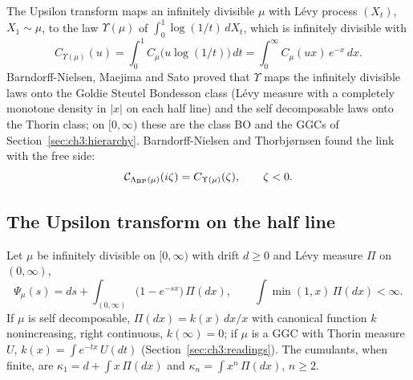 The Upsilon transform \cite{BNT04,BNMS06} maps an infinitely divisible $\mu$ with L\'evy process $(X_t)$, $X_1\sim\mu$, to the law $\Upsilon(\mu)$ of $\int_0^1\log(1/t)\,dX_t$, which is infinitely divisible with
\begin{equation}\label{eq:wigfree:ups}
C_{\Upsilon(\mu)}(u)=\int_0^1C_\mu\big(u\log(1/t)\big)\,dt=\int_0^\infty C_\mu(ux)\,e^{-x}\,dx .
\end{equation}
Barndorff-Nielsen, Maejima and Sato \cite{BNMS06} proved that $\Upsilon$ maps the infinitely divisible laws onto the Goldie Steutel Bondesson class (L\'evy measure with a completely monotone density in $|x|$ on each half line) and the self decomposable laws onto the Thorin class; on $[0,\infty)$ these are the class BO and the GGCs of Section~\ref{sec:ch3:hierarchy}. Barndorff-Nielsen and Thorbj{\o}rnsen \cite{BNT04} found the link with the free side:
\begin{equation}\label{eq:wigfree:bnt}
\mathcal C_{\Lambda_{\rm BP}(\mu)}(i\zeta)=C_{\Upsilon(\mu)}(\zeta),\qquad\zeta<0 .
\end{equation}

\subsection{The Upsilon transform on the half line}\label{sec:wigfree:ups}

Let $\mu$ be infinitely divisible on $[0,\infty)$ with drift $d\ge0$ and L\'evy measure $\Pi$ on $(0,\infty)$,
\[
\Psi_\mu(s)=ds+\int_{(0,\infty)}\big(1-e^{-sx}\big)\,\Pi(dx),\qquad\int\min(1,x)\,\Pi(dx)<\infty .
\]
If $\mu$ is self decomposable, $\Pi(dx)=k(x)\,dx/x$ with canonical function $k$ nonincreasing, right continuous, $k(\infty)=0$; if $\mu$ is a GGC with Thorin measure $U$, $k(x)=\int e^{-tx}\,U(dt)$ (Section~\ref{sec:ch3:readings}). The cumulants, when finite, are $\kappa_1=d+\int x\,\Pi(dx)$ and $\kappa_n=\int x^n\,\Pi(dx)$, $n\ge2$.

